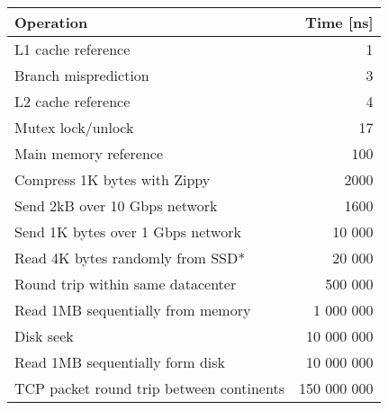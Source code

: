 \begin{table}[H]
    \begin{center}
        \begin{tabular}{|l|r|}
            \hline
            \textbf{Operation}&\textbf{Time [ns]}\\
            \hline
             L1 cache reference&1\\
            \hline
             Branch misprediction&3  \\
            \hline
             L2 cache reference&4  \\
            \hline
             Mutex lock/unlock &17  \\
            \hline
             Main memory reference&100  \\
            \hline
             Compress 1K bytes with Zippy&2000  \\
            \hline
             Send 2kB over 10 Gbps network & 1600\\
            \hline
             Send 1K bytes over 1 Gbps network&10 000  \\
            \hline
             Read 4K bytes randomly from SSD* &20 000  \\
            \hline
             Round trip within same datacenter&500 000  \\
            \hline
             Read 1MB sequentially from memory&1 000 000  \\
            \hline
             Disk seek&10 000 000  \\
            \hline
             Read 1MB sequentially form disk&10 000 000  \\
            \hline
             TCP packet round trip between continents&150 000 000  \\
            \hline
        \end{tabular}
    \end{center}
\end{table}
